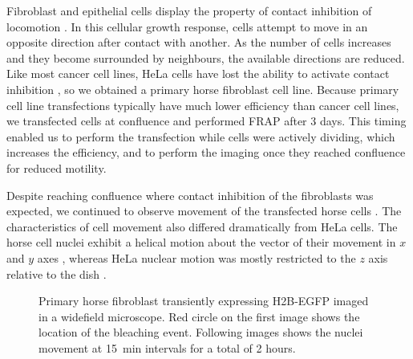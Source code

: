     Fibroblast and epithelial cells display the property of contact
    inhibition of locomotion \citep{abercrombie1970contact}.
    In this cellular growth response, cells attempt to move in an
    opposite direction after contact with another.  As the number of
    cells increases and they become surrounded by neighbours, the
    available directions are reduced.
    Like most cancer cell lines, HeLa cells have
    lost the ability to activate contact inhibition
    \citep{stephenson1982locomotory},
    so we obtained a primary horse fibroblast cell line.
    Because primary cell line transfections typically have much lower
    efficiency than cancer cell lines, we transfected cells at
     confluence and performed FRAP after 3 days.
    This timing enabled us to perform the transfection while cells
    were actively dividing, which increases the
    efficiency, and to perform the imaging once they reached confluence for
    reduced motility.

    Despite reaching confluence where contact inhibition
    of the fibroblasts was expected,
    we continued to observe movement of the transfected
    horse cells .
    The characteristics of cell movement also
    differed dramatically from HeLa cells.
    The horse cell nuclei exhibit a helical motion
    about the vector of their movement
    in $x$ and $y$ axes ,
    whereas HeLa nuclear motion was mostly
    restricted to the $z$ axis relative to
    the dish .

    \begin{figure}
      \centering
        {
          Primary horse fibroblast transiently expressing H2B-EGFP
          imaged in a widefield microscope.  Red circle on the first
          image shows the location of the bleaching event.  Following
          images shows the nuclei movement at \SI{15}{\minute} intervals
          for a total of 2 hours.
        }
      \label{fig:kill-frap:confluent-horse}
    \end{figure}

